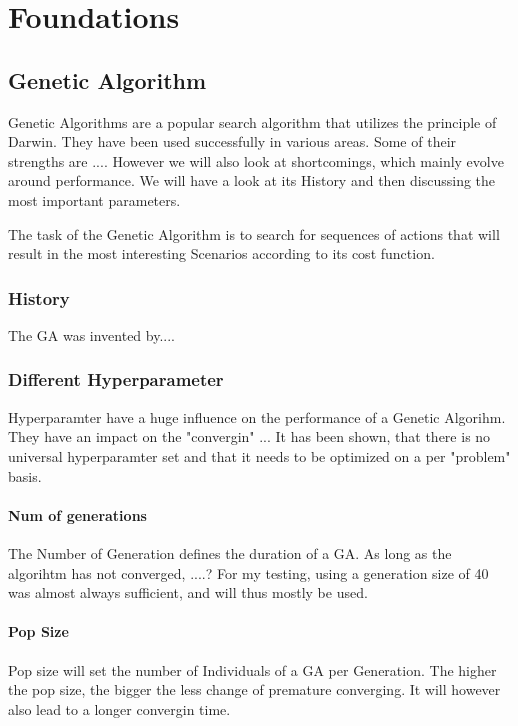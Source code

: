 \chapter{Foundations}
\label{chap:foundation}

\section{Genetic Algorithm}
\label{chap:foundation:genetic_algorithm}
Genetic Algorithms are a popular search algorithm that utilizes the principle of Darwin. They have been used successfully in various areas.
Some of their strengths are ....
However we will also look at shortcomings, which mainly evolve around performance.
We will have a look at its History and then discussing the most important parameters.

The task of the Genetic Algorithm is to search for sequences of actions that will result in the most interesting Scenarios according to its cost function.


\subsection{History}
The GA was invented by....


\subsection{Different Hyperparameter}
Hyperparamter have a huge influence on the performance of a Genetic Algorihm. They have an impact on the "convergin" ...
It has been shown, that there is no universal hyperparamter set and that it needs to be optimized on a per "problem" basis.

\subsubsection{Num of generations}
The Number of Generation defines the duration of a GA. As long as the algorihtm has not converged, ....?
For my testing, using a generation size of 40 was almost always sufficient, and will thus mostly be used.

\subsubsection{Pop Size}
Pop size will set the number of Individuals of a GA per Generation. The higher the pop size, the bigger the less change of premature converging. 
It will however also lead to a longer convergin time.

